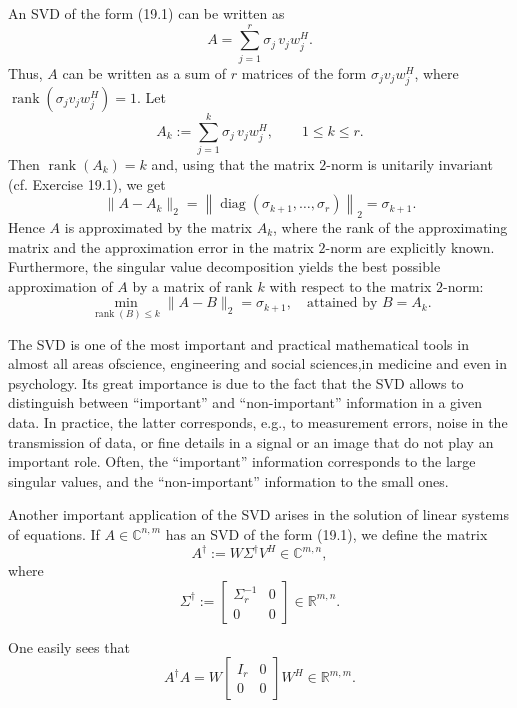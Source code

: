 \documentclass{article}
\begin{document}
\vspace{2cm}

An SVD of the form (19.1) can be written as
\[
A = \sum_{j=1}^r \sigma_j\, v_j w_j^H.
\]
Thus, $A$ can be written as a sum of $r$ matrices of the form $\sigma_j v_j w_j^H$, where
$\operatorname{rank}(\sigma_j v_j w_j^H)=1$. Let
\[
A_k := \sum_{j=1}^k \sigma_j\, v_j w_j^H, \qquad 1 \le k \le r.
\tag{19.2}
\]
Then $\operatorname{rank}(A_k)=k$ and, using that the matrix $2$-norm is unitarily invariant (cf. Exercise 19.1), we get
\[
\|A - A_k\|_2
= \left\| \operatorname{diag}(\sigma_{k+1},\dots,\sigma_r) \right\|_2
= \sigma_{k+1}.
\tag{19.3}
\]
Hence $A$ is approximated by the matrix $A_k$, where the rank of the approximating
matrix and the approximation error in the matrix $2$-norm are explicitly known.
Furthermore, the singular value decomposition yields the best possible approximation
of $A$ by a matrix of rank $k$ with respect to the matrix $2$-norm:
\[
\min_{\operatorname{rank}(B)\le k} \|A - B\|_2 = \sigma_{k+1},
\quad\text{attained by } B = A_k.
\]

\vspace{1cm}

The SVD is one of the most important and practical mathematical tools in almost all areas ofscience, engineering and social sciences,in medicine and even in psychology. Its great importance is due to the fact that the SVD allows to distinguish between “important” and “non-important” information in a given data. In practice, the latter corresponds, e.g., to measurement errors, noise in the transmission of data, or fine details in a signal or an image that do not play an important role. Often, the “important” information corresponds to the large singular values, and the “non-important” information to the small ones.

\vspace{1cm}

Another important application of the SVD arises in the solution of linear systems
of equations. If $A \in \mathbb{C}^{n,m}$ has an SVD of the form (19.1), we define the matrix
\[
A^{\dagger} := W \Sigma^{\dagger} V^H \in \mathbb{C}^{m,n},
\]
where
\[
\Sigma^{\dagger} := 
\begin{bmatrix}
\Sigma_r^{-1} & 0 \\
0 & 0
\end{bmatrix}
\in \mathbb{R}^{m,n}.
\]


One easily sees that
\[
A^{\dagger} A = W 
\begin{bmatrix}
I_r & 0 \\
0 & 0
\end{bmatrix}
W^H \in \mathbb{R}^{m,m}.
\]
\end{document}

